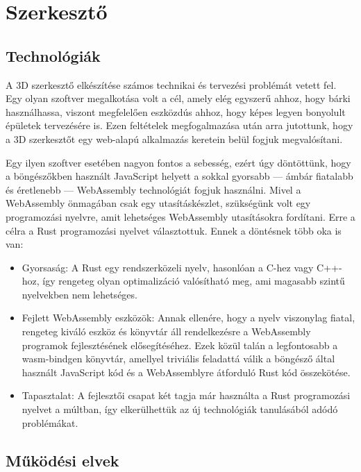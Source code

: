 \section{Szerkesztő}

\subsection{Technológiák}

A 3D szerkesztő elkészítése számos technikai és tervezési problémát vetett fel. Egy olyan szoftver
megalkotása volt a cél, amely elég egyszerű ahhoz, hogy bárki használhassa, viszont megfelelően
eszközdús ahhoz, hogy képes legyen bonyolult épületek tervezésére is. Ezen feltételek
megfogalmazása után arra jutottunk, hogy a 3D szerkesztőt egy web-alapú alkalmazás keretein belül
fogjuk megvalósítani.

Egy ilyen szoftver esetében nagyon fontos a sebesség, ezért úgy döntöttünk, hogy a
böngészőkben használt JavaScript helyett a sokkal gyorsabb --- ámbár fiatalabb és éretlenebb ---
WebAssembly technológiát fogjuk használni. Mivel a WebAssembly önmagában csak egy utasításkészlet,
szükségünk volt egy programozási nyelvre, amit lehetséges WebAssembly utasításokra fordítani.
Erre a célra a Rust programozási nyelvet választottuk. Ennek a döntésnek több oka is van:

\begin{itemize}
    \item Gyorsaság: A Rust egy rendszerközeli nyelv, hasonlóan a C-hez vagy C++-hoz, így rengeteg
    olyan optimalizáció valósítható meg, ami magasabb szintű nyelvekben nem lehetséges.

    \item Fejlett WebAssembly eszközök: Annak ellenére, hogy a nyelv viszonylag fiatal, rengeteg
    kiváló eszköz és könyvtár áll rendelkezésre a WebAssembly programok fejlesztésének
    elősegítéséhez. Ezek közül talán a legfontosabb a wasm-bindgen könyvtár, amellyel triviális
    feladattá válik a böngésző által használt JavaScript kód és a WebAssemblyre átforduló Rust
    kód összekötése.

    \item Tapasztalat: A fejlesztői csapat két tagja már használta a Rust programozási nyelvet a
    múltban, így elkerülhettük az új technológiák tanulásából adódó problémákat.
\end{itemize}

\subsection{Működési elvek}


